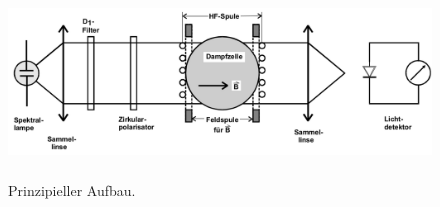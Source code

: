 \begin{figure}
  \centering
  \includegraphics[height = 5cm]{pics/PrinzipiellerAufbau.png}
  \caption{Prinzipieller Aufbau.}
  \label{fig:BspAufbau}
\end{figure}
 
